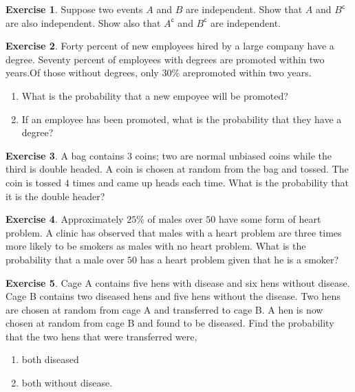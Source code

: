 \documentclass[
]{book}
\theoremstyle{definition}
\theoremstyle{definition}
\theoremstyle{definition}
\newtheorem{exercise}{Exercise}[chapter]
\theoremstyle{definition}
\theoremstyle{remark}
\begin{document}
\begin{exercise}
Suppose two events \(A\) and \(B\) are independent. Show that \(A\) and \(B^{\mathsf{c}}\) are also independent. Show also that \(A^{\mathsf{c}}\) and \(B^{\mathsf{c}}\) are independent.
\end{exercise}

\begin{exercise}

Forty percent of new employees hired by a large company have a degree. Seventy percent of employees with degrees are promoted within two years.Of those without degrees, only \(30\%\) arepromoted within two years.

\begin{enumerate}
\def\labelenumi{\alph{enumi})}
\item
  What is the probability that a new empoyee will be promoted?
\item
  If an employee has been promoted, what is the probability that they have a degree?
\end{enumerate}

\end{exercise}

\begin{exercise}
A bag contains \(3\) coins; two are normal unbiased coins while the third is double headed. A coin is chosen at random from the bag and tossed. The coin is tossed \(4\) times and came up heads each time. What is the probability that it is the double header?
\end{exercise}

\begin{exercise}
Approximately \(25\%\) of males over \(50\) have some form of heart problem. A clinic has observed that males with a heart problem are three times more likely to be smokers as males with no heart problem. What is the probability that a male over \(50\) has a heart problem given that he is a smoker?
\end{exercise}

\begin{exercise}

Cage A contains five hens with disease and six hens without disease. Cage B contains two diseased hens and five hens without the disease. Two hens are chosen at random from cage A and transferred to cage B. A hen is now chosen at random from cage B and found to be diseased. Find the probability that the two hens that were transferred were,

\begin{enumerate}
\def\labelenumi{\alph{enumi})}
\item
  both diseased
\item
  both without disease.
\end{enumerate}

\end{exercise}
\end{document}
